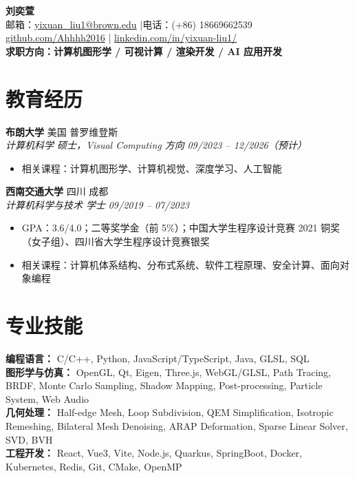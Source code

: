 \documentclass[10pt,fontset=none]{ctexart}
\newcommand{\entry}[4]{
  \textbf{#1} \hfill #2\\
  \textit{#3} \hfill \textit{#4}
}
\begin{document}
\begin{center}
  {\LARGE \textbf{刘奕萱}}\\[0.35em]
  邮箱：\href{mailto:yixuan_liu1@brown.edu}{yixuan\_liu1@brown.edu}
  \quad|\quad 电话：(+86) 18669662539\\
  \href{https://github.com/Ahhhh2016}{github.com/Ahhhh2016}
  \quad|\quad
  \href{https://www.linkedin.com/in/yixuan-liu1/}{linkedin.com/in/yixuan-liu1/}\\[0.15em]
  \textbf{求职方向：计算机图形学 / 可视计算 / 渲染开发 / AI 应用开发}
\end{center}

\section*{教育经历}

\entry{布朗大学}{美国 普罗维登斯}{计算机科学 硕士，Visual Computing 方向}{09/2023 -- 12/2026（预计）}
\begin{itemize}
  \item 相关课程：计算机图形学、计算机视觉、深度学习、人工智能
\end{itemize}

\entry{西南交通大学}{四川 成都}{计算机科学与技术 学士}{09/2019 -- 07/2023}
\begin{itemize}
  \item GPA：3.6/4.0；二等奖学金（前 5\%）；中国大学生程序设计竞赛 2021 铜奖（女子组）、四川省大学生程序设计竞赛银奖
  \item 相关课程：计算机体系结构、分布式系统、软件工程原理、安全计算、面向对象编程
\end{itemize}

\section*{专业技能}

\textbf{编程语言：} C/C++, Python, JavaScript/TypeScript, Java, GLSL, SQL\\
\textbf{图形学与仿真：} OpenGL, Qt, Eigen, Three.js, WebGL/GLSL, Path Tracing, BRDF, Monte Carlo Sampling, Shadow Mapping, Post-processing, Particle System, Web Audio\\
\textbf{几何处理：} Half-edge Mesh, Loop Subdivision, QEM Simplification, Isotropic Remeshing, Bilateral Mesh Denoising, ARAP Deformation, Sparse Linear Solver, SVD, BVH\\
\textbf{工程开发：} React, Vue3, Vite, Node.js, Quarkus, SpringBoot, Docker, Kubernetes, Redis, Git, CMake, OpenMP
\end{document}
